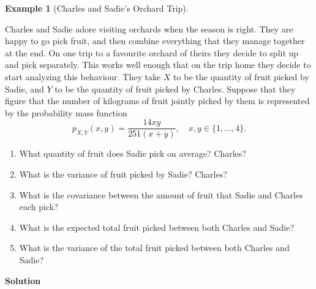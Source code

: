\documentclass[
  letterpaper,
  DIV=11,
  numbers=noendperiod]{scrreprt}
\providecommand{\tightlist}{%
  \setlength{\itemsep}{0pt}\setlength{\parskip}{0pt}}\usepackage{longtable,booktabs,array}
\theoremstyle{definition}
\theoremstyle{definition}
\newtheorem{example}{Example}[chapter]
\theoremstyle{definition}
\theoremstyle{remark}
\begin{document}
\begin{example}[Charles and Sadie's Orchard
Trip]\protect\hypertarget{exm-linear-combination-of-RV}{}\label{exm-linear-combination-of-RV}

Charles and Sadie adore visiting orchards when the season is right. They
are happy to go pick fruit, and then combine everything that they manage
together at the end. On one trip to a favourite orchard of theirs they
decide to split up and pick separately. This works well enough that on
the trip home they decide to start analyzing this behaviour. They take
\(X\) to be the quantity of fruit picked by Sadie, and \(Y\) to be the
quantity of fruit picked by Charles. Suppose that they figure that the
number of kilograms of fruit jointly picked by them is represented by
the probability mass function
\[p_{X,Y}(x,y) = \frac{14xy}{251(x + y)}, \quad x,y\in\{1,\dots,4\}.\]

\begin{enumerate}
\def\labelenumi{\alph{enumi}.}
\tightlist
\item
  What quantity of fruit does Sadie pick on average? Charles?
\item
  What is the variance of fruit picked by Sadie? Charles?
\item
  What is the covariance between the amount of fruit that Sadie and
  Charles each pick?
\item
  What is the expected total fruit picked between both Charles and
  Sadie?
\item
  What is the variance of the total fruit picked between both Charles
  and Sadie?
\end{enumerate}

\begin{tcolorbox}[enhanced jigsaw, colback=white, colframe=quarto-callout-color-frame, arc=.35mm, leftrule=.75mm, rightrule=.15mm, opacityback=0, breakable, bottomrule=.15mm, left=2mm, toprule=.15mm]

\vspace{-3mm}\textbf{Solution}\vspace{3mm}


\end{tcolorbox}
\end{example}
\end{document}
